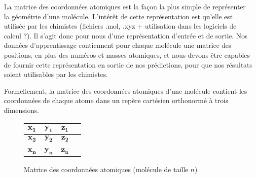 \par La matrice des coordonnées atomiques est la façon la plus simple de représenter la géométrie d'une molécule. L'intérêt de cette représentation est qu'elle est utilisée par les chimistes (fichiers .mol, .xyz + utilisation dans les logiciels de calcul ?). Il s'agit donc pour nous d'une représentation d'entrée et de sortie. Nos données d'apprentissage contiennent pour chaque molécule une matrice des positions, en plus des numéros et masses atomiques, et nous devons être capables de fournir cette représentation en sortie de nos prédictions, pour que nos résultats soient utilisables par les chimistes.\\

\par Formellement, la matrice des coordonnées atomiques d'une molécule contient les coordonnées de chaque atome dans un repère cartésien orthonormé à trois dimensions.

\begin{figure}[!h]
	\centering
	
	\begin{tabular}{|c|c|c|c|}
		\hline
		$\boldsymbol{x_1}$ & $\boldsymbol{y_1}$ & $\boldsymbol{z_1}$ \\ \hline	
		$\boldsymbol{x_2}$ & $\boldsymbol{y_2}$ & $\boldsymbol{z_2}$ \\ \hline	
		\textbf{\rot{... }} & \textbf{\rot{... }} & \textbf{\rot{... }}\\ \hline 	
		$\boldsymbol{x_n}$ & $\boldsymbol{y_n}$ & $\boldsymbol{z_n}$ \\ \hline	
	\end{tabular}

	\caption{Matrice des coordonnées atomiques (molécule de taille $n$)}
\end{figure}